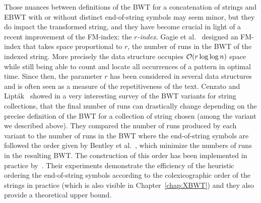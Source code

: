 Those nuances between definitions of the BWT for a concatenation of strings and EBWT with or without distinct end-of-string symbols may seem minor, but they do impact the transformed string, and they have become crucial in light of a recent improvement of the FM-index: the \emph{$r$-index}.
Gagie et al.~\cite{gagie2020fully} designed an FM-index that takes space proportional to $r$, the number of runs in the BWT of the indexed string. More precisely the data structure occupies $\mathcal{O}(r\log\log n)$ space while still being able to count and locate all occurrences of a pattern in optimal time.
Since then, the parameter $r$ has been considered in several data structures and is often seen as a measure of the repetitiveness of the text.
Cenzato and Lipták~\cite{cenzato_et_al_BWT_Collections} showed in a very interesting survey of the BWT variants for string collections, that the final  number of runs can drastically change depending on the precise definition of the BWT for a collection of string chosen (among the variant we described above). 
They compared the number of runs produced by each variant to the number of runs in the BWT where the end-of-string symbols are followed the order given by Bentley et al.~\cite{bentley2019complexity}, which minimize the numbers of runs in the resulting BWT. The construction of this order has been implemented in practice by~\cite{cenzato2023computing}.
Their experiments demonstrate the efficiency of the heuristic ordering the end-of-string symbols according to the colexicographic order of the strings in practice (which is also visible in Chapter~\ref{chap:XBWT}) and they also provide a theoretical upper bound.

